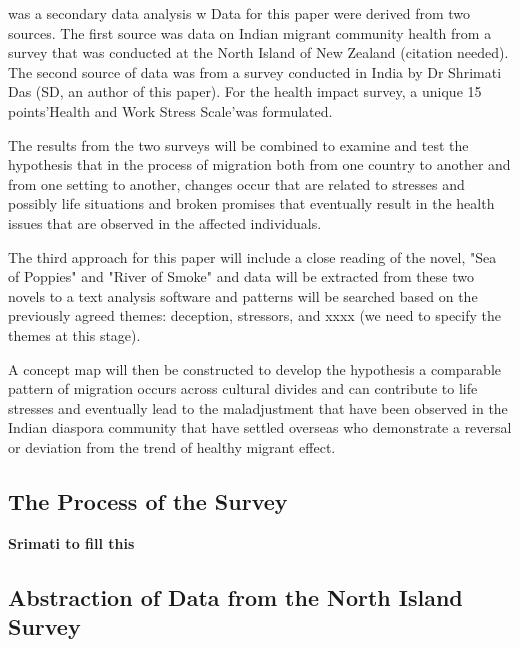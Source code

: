  was a secondary data analysis w
Data for this paper were derived from two sources. The first source was data on Indian migrant community health from a survey that was conducted at the North Island of New Zealand (citation needed). The second source of data was from a survey conducted in India by Dr Shrimati Das (SD, an author of this paper). For the health impact survey, a unique 15 points'Health and Work Stress Scale'was formulated. 

The results from the two surveys will be combined to examine and test the hypothesis that in the process of migration both from one country to another and from one setting to another, changes occur that are related to stresses and possibly life situations and broken promises that eventually result in the health issues that are observed in the affected individuals.

The third approach for this paper will include a close reading of the novel, "Sea of Poppies" and "River of Smoke" and data will be extracted from these two novels to a text analysis software and patterns will be searched based on the previously agreed themes: deception, stressors, and xxxx (we need to specify the themes at this stage).

A concept map will then be constructed to develop the hypothesis a comparable pattern of migration occurs across cultural divides and can contribute to life stresses and eventually lead to the maladjustment that have been observed in the Indian diaspora community that have settled overseas who demonstrate a reversal or deviation from the trend of healthy migrant effect. 

\subsection{The Process of the Survey}
\textbf{Srimati to fill this}

\subsection{Abstraction of Data from the North Island Survey}



    
